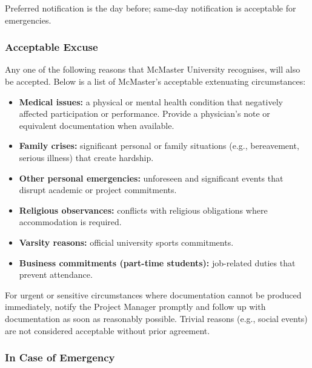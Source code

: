 \documentclass{article}
\begin{document}
\begin{enumerate}
Preferred notification is the day before; same-day notification is acceptable for emergencies.

\subsubsection*{Acceptable Excuse}

Any one of the following reasons that McMaster University recognises, will also be accepted. Below is a list of McMaster's acceptable extenuating circumstances:

\begin{itemize}
  \item \textbf{Medical issues:} a physical or mental health condition that negatively affected participation or performance. Provide a physician's note or equivalent documentation when available.
  \item \textbf{Family crises:} significant personal or family situations (e.g., bereavement, serious illness) that create hardship.
  \item \textbf{Other personal emergencies:} unforeseen and significant events that disrupt academic or project commitments.
  \item \textbf{Religious observances:} conflicts with religious obligations where accommodation is required.
  \item \textbf{Varsity reasons:} official university sports commitments.
  \item \textbf{Business commitments (part-time students):} job-related duties that prevent attendance.
\end{itemize}

For urgent or sensitive circumstances where documentation cannot be produced immediately, notify the Project Manager promptly and follow up with documentation as soon as reasonably possible. Trivial reasons (e.g., social events) are not considered acceptable without prior agreement.

\subsubsection*{In Case of Emergency}


\end{enumerate}
\end{document}
